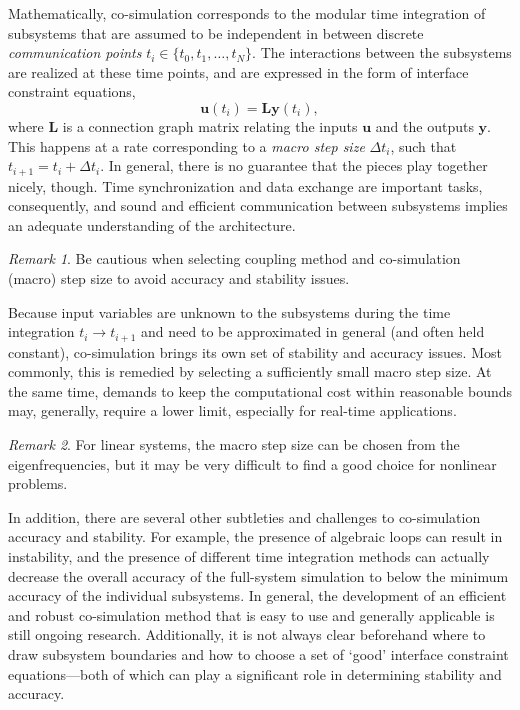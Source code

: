 \documentclass[prb,aps,showpacs,floatfix,twocolumn,10pt]{revtex4-1}
\newcommand{\vect}[1]{\bm{#1}}
\theoremstyle{plain}
\theoremstyle{remark}
\newtheorem{remark}{Remark}[guideline]
\begin{document}
Mathematically, co-simulation corresponds to the modular time integration of subsystems that are assumed to be independent in between discrete \emph{communication points} $t_i \in \{ t_0, t_1, \dots, t_N \}$.
The interactions between the subsystems are realized at these time points, and are expressed in the form of interface constraint equations,
\begin{equation}
\label{equ:cosimulation_connections}
	\vect{u}(t_i)
	=
	\vect{L}
	\vect{y}(t_i)
	,
\end{equation}
where $\vect{L}$ is a connection graph matrix relating the inputs $\vect{u}$ and the outputs $\vect{y}$.
This happens at a rate corresponding to a \emph{macro step size} $\Delta t_i$, such that $t_{i+1} =  t_i + \Delta t_i$.
In general, there is no guarantee that the pieces play together nicely, though.
Time synchronization and data exchange are important tasks, consequently, and sound and efficient communication between subsystems implies an adequate understanding of the architecture.

\begin{remark}
	Be cautious when selecting coupling method and co-simulation (macro) step size to avoid accuracy and stability issues.
\end{remark}

Because input variables are unknown to the subsystems during the time integration $t_i \rightarrow t_{i+1}$ and need to be approximated in general (and often held constant), co-simulation brings its own set of stability and accuracy issues.
Most commonly, this is remedied by selecting a sufficiently small macro step size.
At the same time, demands to keep the computational cost within reasonable bounds may, generally, require a lower limit, especially for real-time applications.

\begin{remark}
	For linear systems, the macro step size can be chosen from the eigenfrequencies, but it may be very difficult to find a good choice for nonlinear problems.
\end{remark}

In addition, there are several other subtleties and challenges to co-simulation accuracy and stability.
For example, the presence of algebraic loops can result in instability\cite{Kuebler2000}, and the presence of different time integration methods can actually decrease the overall accuracy of the full-system simulation to below the minimum accuracy of the individual subsystems\cite{Sicklinger2014Thesis}.
In general, the development of an efficient and robust co-simulation method that is easy to use and generally applicable is still ongoing research.\cite{Arnold2009}
Additionally, it is not always clear beforehand where to draw subsystem boundaries and how to choose a set of `good' interface constraint equations---both of which can play a significant role in determining stability and accuracy.
\end{document}
